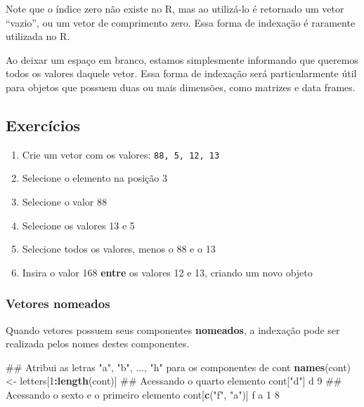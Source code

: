\documentclass[10pt,a4paper]{book}
\newenvironment{Shaded}{\begin{snugshade}}{\end{snugshade}}
\newcommand{\KeywordTok}[1]{\textcolor[rgb]{0.13,0.29,0.53}{\textbf{#1}}}
\newcommand{\DecValTok}[1]{\textcolor[rgb]{0.00,0.00,0.81}{#1}}
\newcommand{\StringTok}[1]{\textcolor[rgb]{0.31,0.60,0.02}{#1}}
\newcommand{\OperatorTok}[1]{\textcolor[rgb]{0.81,0.36,0.00}{\textbf{#1}}}
\newcommand{\NormalTok}[1]{#1}
\providecommand{\tightlist}{%
  \setlength{\itemsep}{0pt}\setlength{\parskip}{0pt}}
\begin{document}
Note que o índice zero não existe no R, mas ao utilizá-lo é retornado um
vetor ``vazio'', ou um vetor de comprimento zero. Essa forma de
indexação é raramente utilizada no R.

Ao deixar um espaço em branco, estamos simplesmente informando que
queremos todos os valores daquele vetor. Essa forma de indexação será
particularmente útil para objetos que possuem duas ou mais dimensões,
como matrizes e data frames.

\subsection*{Exercícios}\label{exercicios-5}


\begin{enumerate}
\def\labelenumi{\arabic{enumi}.}
\tightlist
\item
  Crie um vetor com os valores: \texttt{88,\ 5,\ 12,\ 13}
\item
  Selecione o elemento na posição 3
\item
  Selecione o valor 88
\item
  Selecione os valores 13 e 5
\item
  Selecione todos os valores, menos o 88 e o 13
\item
  Insira o valor 168 \textbf{entre} os valores 12 e 13, criando um novo
  objeto
\end{enumerate}

\subsubsection{Vetores nomeados}\label{vetores-nomeados}

Quando vetores possuem seus componentes \textbf{nomeados}, a indexação
pode ser realizada pelos nomes destes componentes.

\begin{Shaded}
\begin{Highlighting}[]
\NormalTok{## Atribui as letras "a", "b", ..., "h" para os componentes de cont}
\KeywordTok{names}\NormalTok{(cont) <-}\StringTok{ }\NormalTok{letters[}\DecValTok{1}\OperatorTok{:}\KeywordTok{length}\NormalTok{(cont)]}
\NormalTok{## Acessando o quarto elemento}
\NormalTok{cont[}\StringTok{"d"}\NormalTok{]}
\NormalTok{d }
\DecValTok{9} 
\NormalTok{## Acessando o sexto e o primeiro elemento}
\NormalTok{cont[}\KeywordTok{c}\NormalTok{(}\StringTok{"f"}\NormalTok{, }\StringTok{"a"}\NormalTok{)]}
\NormalTok{f a }
\DecValTok{1} \DecValTok{8} 
\end{Highlighting}
\end{Shaded}
\end{document}
